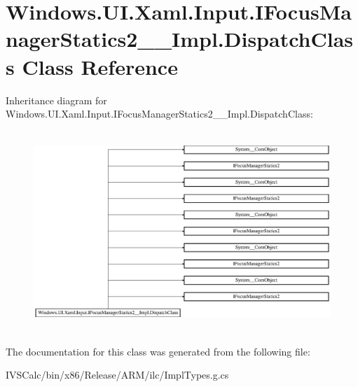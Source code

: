 \hypertarget{class_windows_1_1_u_i_1_1_xaml_1_1_input_1_1_i_focus_manager_statics2_____impl_1_1_dispatch_class}{}\section{Windows.\+U\+I.\+Xaml.\+Input.\+I\+Focus\+Manager\+Statics2\+\_\+\+\_\+\+Impl.\+Dispatch\+Class Class Reference}
\label{class_windows_1_1_u_i_1_1_xaml_1_1_input_1_1_i_focus_manager_statics2_____impl_1_1_dispatch_class}
Inheritance diagram for Windows.\+U\+I.\+Xaml.\+Input.\+I\+Focus\+Manager\+Statics2\+\_\+\+\_\+\+Impl.\+Dispatch\+Class\+:\begin{figure}[H]
\begin{center}
\leavevmode
\includegraphics[height=7.604939cm]{class_windows_1_1_u_i_1_1_xaml_1_1_input_1_1_i_focus_manager_statics2_____impl_1_1_dispatch_class}
\end{center}
\end{figure}


The documentation for this class was generated from the following file\+:\begin{DoxyCompactItemize}
\item 
I\+V\+S\+Calc/bin/x86/\+Release/\+A\+R\+M/ilc/Impl\+Types.\+g.\+cs\end{DoxyCompactItemize}
